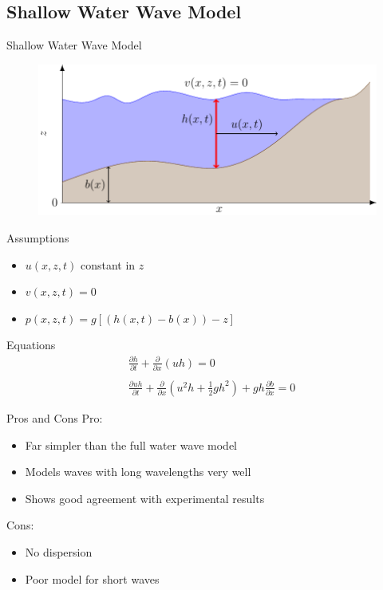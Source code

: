 \documentclass[pdf]{beamer}
\begin{document}
\subsection{Shallow Water Wave Model}
\begin{frame}{Shallow Water Wave Model}
	\begin{figure}
		\includegraphics[width=\textwidth]{./Pics/WaterModelDiagrams/SWWE.pdf}
	\end{figure}
\end{frame}
\begin{frame}{Assumptions}
	\begin{itemize}
		\item $u(x,z,t)$ constant in $z$
		\item $v(x,z,t) = 0$
		\item $p(x,z,t) = g\left[ \left(h(x,t) - b(x)\right) - z\right]$
	\end{itemize}
\end{frame}
\begin{frame}{Equations}
	\begin{align}
	&\frac{\partial h}{\partial t} + \frac{\partial }{\partial x}\left( uh\right) = 0 \\ \nonumber \\
	&\frac{\partial u h}{\partial t} + \frac{\partial }{\partial x}\left( u^2h + \frac{1}{2}gh^2\right) + gh\frac{\partial b}{\partial x} = 0
	\end{align}
\end{frame}
\begin{frame}{Pros and Cons}
	Pro:
	\begin{itemize}
		\item Far simpler than the full water wave model
		\item Models waves with long wavelengths very well 
		\item Shows good agreement with experimental results
	\end{itemize}
	Cons:
	\begin{itemize}
		\item No dispersion
		\item Poor model for short waves 
	\end{itemize}
\end{frame}
\end{document}
